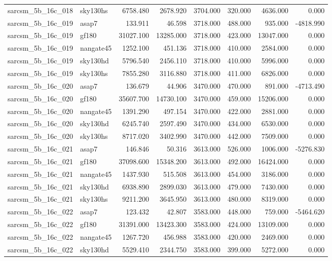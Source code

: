 \begin{tabular}{llrrrrrr}
sarcsm\_5b\_16c\_018 & sky130hs & 6758.480 & 2678.920 & 3704.000 & 320.000 & 4636.000 & 0.000 \\
sarcsm\_5b\_16c\_019 & asap7 & 133.911 & 46.598 & 3718.000 & 488.000 & 935.000 & -4818.990 \\
sarcsm\_5b\_16c\_019 & gf180 & 31027.100 & 13285.000 & 3718.000 & 423.000 & 13047.000 & 0.000 \\
sarcsm\_5b\_16c\_019 & nangate45 & 1252.100 & 451.136 & 3718.000 & 410.000 & 2584.000 & 0.000 \\
sarcsm\_5b\_16c\_019 & sky130hd & 5796.540 & 2456.110 & 3718.000 & 410.000 & 5996.000 & 0.000 \\
sarcsm\_5b\_16c\_019 & sky130hs & 7855.280 & 3116.880 & 3718.000 & 411.000 & 6826.000 & 0.000 \\
sarcsm\_5b\_16c\_020 & asap7 & 136.679 & 44.906 & 3470.000 & 470.000 & 891.000 & -4713.490 \\
sarcsm\_5b\_16c\_020 & gf180 & 35607.700 & 14730.100 & 3470.000 & 459.000 & 15206.000 & 0.000 \\
sarcsm\_5b\_16c\_020 & nangate45 & 1391.290 & 497.154 & 3470.000 & 422.000 & 2881.000 & 0.000 \\
sarcsm\_5b\_16c\_020 & sky130hd & 6245.740 & 2597.490 & 3470.000 & 434.000 & 6530.000 & 0.000 \\
sarcsm\_5b\_16c\_020 & sky130hs & 8717.020 & 3402.990 & 3470.000 & 442.000 & 7509.000 & 0.000 \\
sarcsm\_5b\_16c\_021 & asap7 & 146.846 & 50.316 & 3613.000 & 526.000 & 1006.000 & -5276.830 \\
sarcsm\_5b\_16c\_021 & gf180 & 37098.600 & 15348.200 & 3613.000 & 492.000 & 16424.000 & 0.000 \\
sarcsm\_5b\_16c\_021 & nangate45 & 1437.930 & 515.508 & 3613.000 & 454.000 & 3186.000 & 0.000 \\
sarcsm\_5b\_16c\_021 & sky130hd & 6938.890 & 2899.030 & 3613.000 & 479.000 & 7430.000 & 0.000 \\
sarcsm\_5b\_16c\_021 & sky130hs & 9211.200 & 3645.950 & 3613.000 & 480.000 & 8319.000 & 0.000 \\
sarcsm\_5b\_16c\_022 & asap7 & 123.432 & 42.807 & 3583.000 & 448.000 & 759.000 & -5464.620 \\
sarcsm\_5b\_16c\_022 & gf180 & 31391.000 & 13423.300 & 3583.000 & 424.000 & 13109.000 & 0.000 \\
sarcsm\_5b\_16c\_022 & nangate45 & 1267.720 & 456.988 & 3583.000 & 420.000 & 2469.000 & 0.000 \\
sarcsm\_5b\_16c\_022 & sky130hd & 5529.410 & 2344.750 & 3583.000 & 399.000 & 5272.000 & 0.000 \\

\end{tabular}
